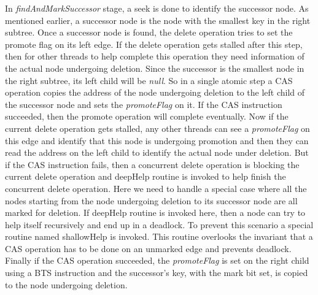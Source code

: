 \documentclass[11pt]{article}
\begin{document}
\begin{multicols}{2}
In \textit{findAndMarkSuccessor} stage, a seek is done to identify the successor node. As mentioned earlier, a successor node is the node with the smallest key in the right subtree. Once a successor node is found, the delete operation tries to set the promote flag on its left edge. If the delete operation gets stalled after this step, then for other threads to help complete this operation they need information of the actual node undergoing deletion. Since the successor is the smallest node in the right subtree, its left child will be \textit{null}. So in a single atomic step a CAS operation copies the address of the node undergoing deletion to the left child of the successor node and sets the \textit{promoteFlag} on it. If the CAS instruction succeeded, then the promote operation will complete eventually. Now if the current delete operation gets stalled, any other threads can see a \textit{promoteFlag} on this edge and identify that this node is undergoing promotion and then they can read the address on the left child to identify the actual node under deletion. But if the CAS instruction fails, then a concurrent delete operation is blocking the current delete operation and deepHelp routine is invoked to help finish the concurrent delete operation. Here we need to handle a special case where all the nodes starting from the node undergoing deletion to its successor node are all marked for deletion. If deepHelp routine is invoked here, then a node can try to help itself recursively and end up in a deadlock. To prevent this scenario a special routine named shallowHelp is invoked. This routine overlooks the invariant that a CAS operation has to be done on an unmarked edge and prevents deadlock. Finally if the CAS operation succeeded, the \textit{promoteFlag} is set on the right child using a BTS instruction and the successor's key, with the mark bit set, is copied to the node undergoing deletion.


\end{multicols}
\end{document}
